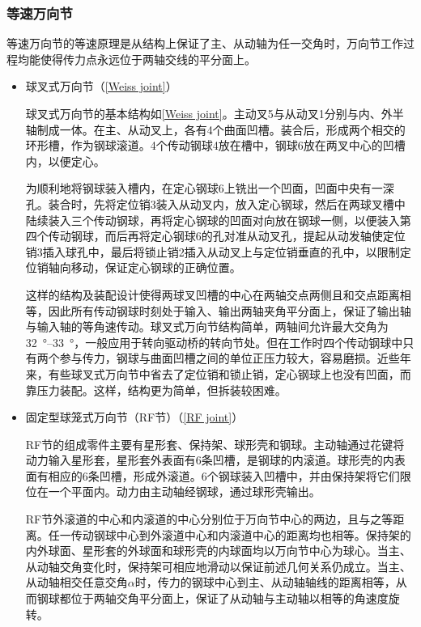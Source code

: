 \documentclass[UTF8]{ctexart}
\numberwithin{figure}{section}
\numberwithin{table}{section}
\begin{document}
\subsubsection{等速万向节}

等速万向节的等速原理是从结构上保证了主、从动轴为任一交角时，万向节工作过程均能使得传力点永远位于两轴交线的平分面上。

\begin{itemize}
	\item 球叉式万向节（\cref{Weiss joint}）

	      球叉式万向节的基本结构如\cref{Weiss joint}。主动叉5与从动叉1分别与内、外半轴制成一体。在主、从动叉上，各有4个曲面凹槽。装合后，形成两个相交的环形槽，作为钢球滚道。4个传动钢球4放在槽中，钢球6放在两叉中心的凹槽内，以便定心。

	      为顺利地将钢球装入槽内，在定心钢球6上铣出一个凹面，凹面中央有一深孔。装合时，先将定位销3装入从动叉内，放入定心钢球，然后在两球叉槽中陆续装入三个传动钢球，再将定心钢球的凹面对向放在钢球一侧，以便装入第四个传动钢球，而后再将定心钢球6的孔对准从动叉孔，提起从动发轴使定位销3插入球孔中，最后将锁止销2插入从动叉上与定位销垂直的孔中，以限制定位销轴向移动，保证定心钢球的正确位置。

	      这样的结构及装配设计使得两球叉凹槽的中心在两轴交点两侧且和交点距离相等，因此所有传动钢球时刻处于输入、输出两轴夹角平分面上，保证了输出轴与输入轴的等角速传动。球叉式万向节结构简单，两轴间允许最大交角为\qtyrange[range-phrase = $\,\sim\,$, range-units = single]{32}{33}{\degree}，一般应用于转向驱动桥的转向节处。但在工作时四个传动钢球中只有两个参与传力，钢球与曲面凹槽之间的单位正压力较大，容易磨损。近些年来，有些球叉式万向节中省去了定位销和锁止销，定心钢球上也没有凹面，而靠压力装配。这样，结构更为简单，但拆装较困难。

	\item 固定型球笼式万向节（RF节）（\cref{RF joint}）

	      RF节的组成零件主要有星形套、保持架、球形壳和钢球。主动轴通过花键将动力输入星形套，星形套外表面有6条凹槽，是钢球的内滚道。球形壳的内表面有相应的6条凹槽，形成外滚道。6个钢球装入凹槽中，并由保持架将它们限位在一个平面内。动力由主动轴经钢球，通过球形壳输出。

	      RF节外滚道的中心和内滚道的中心分别位于万向节中心的两边，且与之等距离。任一传动钢球中心到外滚道中心和内滚道中心的距离均也相等。保持架的内外球面、星形套的外球面和球形壳的内球面均以万向节中心为球心。当主、从动轴交角变化时，保持架可相应地滑动以保证前述几何关系仍成立。当主、从动轴相交任意交角$\alpha$时，传力的钢球中心到主、从动轴轴线的距离相等，从而钢球都位于两轴交角平分面上，保证了从动轴与主动轴以相等的角速度旋转。


\end{itemize}
\end{document}
